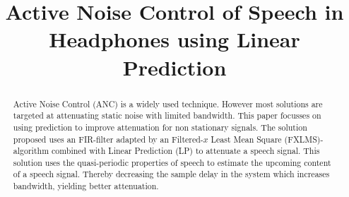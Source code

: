 \documentclass[conference]{IEEEtran}
\begin{document}
\title{Active Noise Control of Speech in Headphones using Linear Prediction}

\author{
}

\maketitle

\begin{abstract}
Active Noise Control (ANC) is a widely used technique. However most solutions are targeted at attenuating static noise with limited bandwidth. This paper focusses on using prediction to improve attenuation for non stationary signals.
The solution proposed uses an FIR-filter adapted by an Filtered-$x$ Least Mean Square (FXLMS)-algorithm combined with Linear Prediction (LP) to attenuate a speech signal. This solution uses the quasi-periodic properties of speech to estimate the upcoming content of a speech signal. Thereby decreasing the sample delay in the system which increases bandwidth, yielding better attenuation.
\end{abstract}

\IEEEpeerreviewmaketitle







\end{document}
